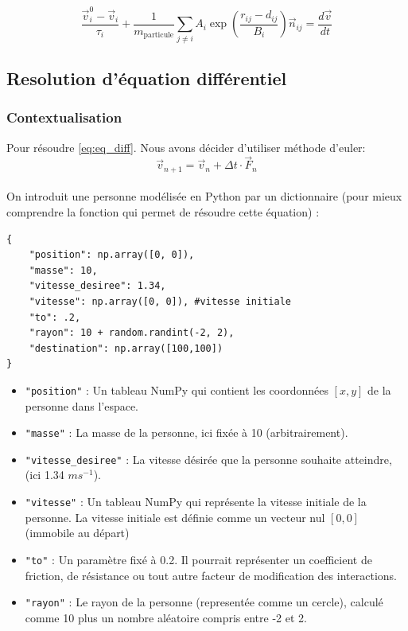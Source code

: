\documentclass[a4paper,12pt]{article}
\begin{document}
\begin{equation}
\label{eq:eq_diff}
\frac{\vec{v}_i^0 - \vec{v}_i}{\tau_i} + \frac{1}{m_{\text{particule}}} \sum_{j \neq i} A_i \exp\left( \frac{r_{ij} - d_{ij}}{B_i} \right) \vec{n}_{ij} = \frac{d\vec{v}}{dt}
\end{equation}

\subsection{Resolution d'équation différentiel}
\subsubsection{Contextualisation}

\indent Pour résoudre \eqref{eq:eq_diff}. Nous avons décider d'utiliser méthode d'euler:
\[
\vec{v}_{n+1} = \vec{v}_n + \Delta t \cdot \vec{F}_n
\]
\\ On introduit une personne modélisée en Python par un dictionnaire (pour mieux comprendre  la fonction qui permet de résoudre cette équation) :

\begin{verbatim}
{
	"position": np.array([0, 0]),
	"masse": 10,
	"vitesse_desiree": 1.34, 
	"vitesse": np.array([0, 0]), #vitesse initiale
	"to": .2,
	"rayon": 10 + random.randint(-2, 2),
	"destination": np.array([100,100])
} 
\end{verbatim}

\begin{itemize}
    \item \texttt{"position"} : Un tableau NumPy qui contient les coordonnées \([x, y]\) de la personne dans l'espace. 
    
    \item \texttt{"masse"} : La masse de la personne, ici fixée à 10 (arbitrairement).
    
    \item \texttt{"vitesse\_desiree"} : La vitesse désirée que la personne souhaite atteindre, (ici 1.34 $ms^{-1}$).
    
    \item \texttt{"vitesse"} : Un tableau NumPy qui représente la vitesse initiale de la personne. La vitesse initiale est définie comme un vecteur nul \([0, 0]\) (immobile au départ)
    
    \item \texttt{"to"} : Un paramètre fixé à 0.2. Il pourrait représenter un coefficient de friction, de résistance ou tout autre facteur de modification des interactions.
    
    \item \texttt{"rayon"} : Le rayon de la personne (representée comme un cercle), calculé comme 10 plus un nombre aléatoire compris entre -2 et 2. 
\end{itemize}
\end{document}
